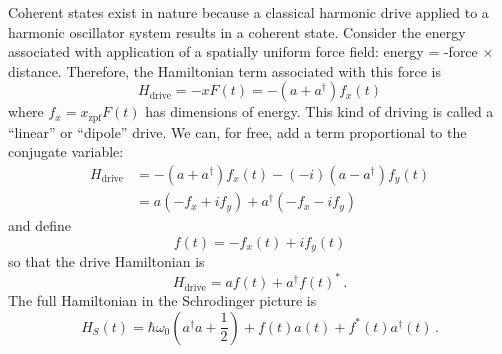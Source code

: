 
Coherent states exist in nature because a classical harmonic drive applied to a harmonic oscillator system results in a coherent state.
Consider the energy associated with application of a spatially uniform force field: energy = -force $\times$ distance.
Therefore, the Hamiltonian term associated with this force is
\begin{equation*}
  H_{\textrm{drive}}
  = -x F(t)
  = -(a + a^\dagger) f_x(t)
\end{equation*}
where $f_{x} = x_\text{zpf} F(t)$ has dimensions of energy.
This kind of driving is called a ``linear'' or ``dipole'' drive.
We can, for free, add a term proportional to the conjugate variable:
\begin{align*}
  H_{\textrm{drive}}
  &=  -(a+a^{\dagger})f_{x}(t)-(-i)(a-a^{\dagger})f_{y}(t)\\
  &= a(-f_{x}+if_{y})+a^{\dagger}(-f_{x}-if_{y})
\end{align*}
and define
\begin{equation}
  f(t) = -f_x(t) + i f_y(t)
\end{equation}
so that the drive Hamiltonian is
\begin{equation*}
  H_{\textrm{drive}} = af(t)+a^{\dagger}f(t)^{*} \, .
\end{equation*}
The full Hamiltonian in the Schrodinger picture is
\begin{equation}
  H_S(t)
  = \hbar \omega_0 \left( a^{\dagger} a + \frac{1}{2} \right) + f(t) a(t) + f^*(t) a^\dagger(t)
  \, .
\end{equation}


